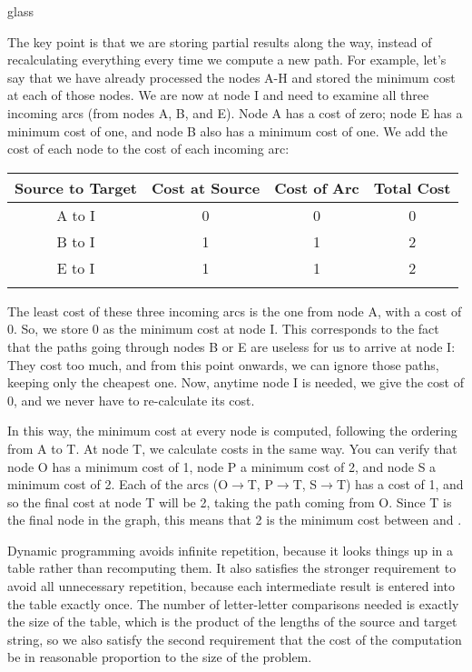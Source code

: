 \begin{tblsfilledsymbol}{}{glass}
\begin{underthehood}
The key point is that we are storing partial results along the way,
instead of recalculating everything every time we compute a new path.
For example, let's say that we have already processed the nodes A-H
and stored the minimum cost at each of those nodes.  We are now at
node I and need to examine all three incoming arcs (from nodes A, B,
and E).  Node A has a cost of zero; node E has a minimum cost of one,
and node B also has a minimum cost of one.  We add the cost of each
node to the cost of each incoming arc:

  \begin{center}
    \begin{tabular}{c  c@{\,+\,}c@{\,=\,}c}
    \lsptoprule
      Source to Target & Cost at Source & Cost of Arc & Total Cost \\
      \midrule
      A to I & 0 & 0 & 0 \\
      B to I & 1 & 1 & 2 \\
      E to I & 1 & 1 & 2 \\
    \lspbottomrule
    \end{tabular}
    \label{fig:node-i}
  \end{center}

The least cost of these three incoming arcs is the one from node A,
with a cost of 0.  So, we store 0 as the minimum cost at node I.  This
corresponds to the fact that the paths going through nodes B or E are
useless for us to arrive at node I: They cost too much, and from this
point onwards, we can ignore those paths, keeping only the cheapest
one.  Now, anytime node I is needed, we give the cost of 0, and
we never have to re-calculate its cost.

In this way, the minimum cost at every node is computed, following the
ordering from A to T.  At node T, we calculate costs in the same way.
You can verify that node O has a minimum cost of 1, node P a minimum
cost of 2, and node S a minimum cost of 2.  Each of the arcs (O$\to$T,
P$\to$T, S$\to$T) has a cost of 1, and so the final cost at node T
will be 2, taking the path coming from O.  Since T is the final node
in the graph, this means that 2 is the minimum cost between
 and .

Dynamic programming avoids infinite repetition, because it looks
things up in a table rather than recomputing them.  It also satisfies
the stronger requirement to avoid all unnecessary repetition, because
each intermediate result is entered into the table exactly once.  The
number of letter-letter comparisons needed is exactly the size of the
table, which is the product of the lengths of the source and target
string, so we also satisfy the second requirement that the cost of the
computation be in reasonable proportion to the size of the problem.


\end{underthehood}
\end{tblsfilledsymbol}
